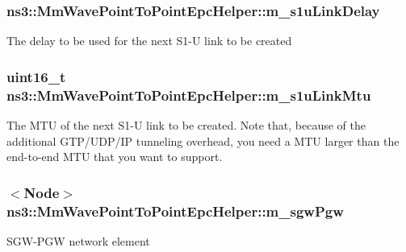 \subsubsection[{\texorpdfstring{m\+\_\+s1u\+Link\+Delay}{m_s1uLinkDelay}}]{ ns3\+::\+Mm\+Wave\+Point\+To\+Point\+Epc\+Helper\+::m\+\_\+s1u\+Link\+Delay\hspace{0.3cm}{\ttfamily [private]}}\hypertarget{classns3_1_1MmWavePointToPointEpcHelper_ac3ac70052255531fa75d5cd0b716d54b}{}\label{classns3_1_1MmWavePointToPointEpcHelper_ac3ac70052255531fa75d5cd0b716d54b}
The delay to be used for the next S1-\/U link to be created 
\subsubsection[{\texorpdfstring{m\+\_\+s1u\+Link\+Mtu}{m_s1uLinkMtu}}]{\setlength{\rightskip}{0pt plus 5cm}uint16\+\_\+t ns3\+::\+Mm\+Wave\+Point\+To\+Point\+Epc\+Helper\+::m\+\_\+s1u\+Link\+Mtu\hspace{0.3cm}{\ttfamily [private]}}\hypertarget{classns3_1_1MmWavePointToPointEpcHelper_a3caa07a7eb4129570763154b1d6c2630}{}\label{classns3_1_1MmWavePointToPointEpcHelper_a3caa07a7eb4129570763154b1d6c2630}
The M\+TU of the next S1-\/U link to be created. Note that, because of the additional G\+T\+P/\+U\+D\+P/\+IP tunneling overhead, you need a M\+TU larger than the end-\/to-\/end M\+TU that you want to support. 
\subsubsection[{\texorpdfstring{m\+\_\+sgw\+Pgw}{m_sgwPgw}}]{$<${\bf Node}$>$ ns3\+::\+Mm\+Wave\+Point\+To\+Point\+Epc\+Helper\+::m\+\_\+sgw\+Pgw\hspace{0.3cm}{\ttfamily [private]}}\hypertarget{classns3_1_1MmWavePointToPointEpcHelper_a164b7ce64e19868995296d492e7ddd21}{}\label{classns3_1_1MmWavePointToPointEpcHelper_a164b7ce64e19868995296d492e7ddd21}
S\+G\+W-\/\+P\+GW network element 
